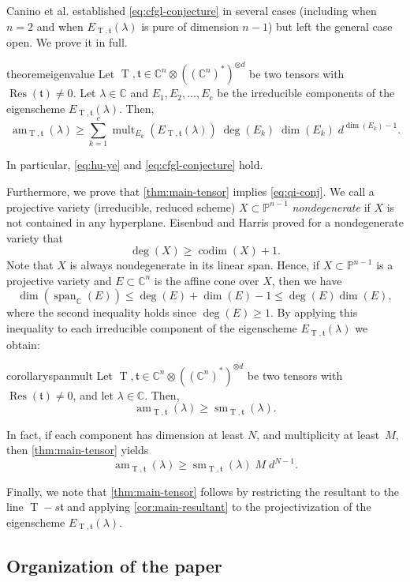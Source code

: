 \documentclass[11pt,letterpaper]{article}
\numberwithin{equation}{section}
\newcommand{\PP}{\mathbb{P}}
\newcommand{\CC}{\mathbb{C}}
\newcommand{\ft}{\mathfrak{t}}
\DeclareMathOperator{\codim}{codim}
\DeclareMathOperator{\am}{am}
\DeclareMathOperator{\sm}{sm}
\DeclareMathOperator{\Res}{Res}
\DeclareMathOperator{\T}{T}
\DeclareMathOperator{\mult}{mult}
\begin{document}
Canino et al. established \eqref{eq:cfgl-conjecture} in several cases (including when $n=2$ and when $E_{\T,\ft}(\lambda)$ is pure of dimension $n-1$) but left the general case open.
We prove it in full.
\begin{restatable}{theorem}{eigenvalue}
\label{thm:main-tensor}
Let $\T,\ft\in\CC^n\otimes((\CC^n)^\ast)^{\otimes d}$ be two tensors with $\Res(\ft)\neq 0$.
    Let $\lambda\in\CC$ and $E_1,E_2,\dots,E_c$ be the irreducible components of the eigenscheme $E_{\T,\ft}(\lambda)$.
    Then, \[
    \am_{\T,\ft}(\lambda) \geq \sum_{k=1}^c \mult_{E_k}(E_{\T,\ft}(\lambda))\;\deg(E_k)\; \dim(E_k)\; d^{\dim(E_k)-1}. 
    \]
\end{restatable}
\noindent
In particular, \eqref{eq:hu-ye} and \eqref{eq:cfgl-conjecture} hold.

Furthermore, we prove that \cref{thm:main-tensor} implies \eqref{eq:qi-conj}.
We call a projective variety (irreducible, reduced scheme) $X\subset\PP^{n-1}$ \emph{nondegenerate} if $X$ is not contained in any hyperplane.
Eisenbud and Harris \cite{Eisenbud-Harris-87} proved for a nondegenerate variety that \[
\deg(X) \geq \codim(X) + 1.
\] Note that $X$ is always nondegenerate in its linear span.
Hence, if $X\subset\PP^{n-1}$ is a projective variety and $E\subset \CC^{n}$ is the affine cone over $X$, then we have \[
\dim\left(\operatorname{span}_{\CC}(E)\right) \leq \deg(E) + \dim(E) - 1 \leq \deg(E)\dim(E), 
\] where the second inequality holds since $\deg(E)\geq 1$.
By applying this inequality to each irreducible component of the eigenscheme $E_{\T,\ft}(\lambda)$ we obtain:

\begin{restatable}{corollary}{spanmult}
\label{cor:span-mult}
    Let $\T,\ft\in\CC^n\otimes((\CC^n)^\ast)^{\otimes d}$ be two tensors with $\Res(\ft)\neq 0$, and
    let $\lambda\in\CC$.
    Then, \[
    \am_{\T,\ft}(\lambda)\geq \sm_{\T,\ft}(\lambda).
    \]
\end{restatable}
\noindent
In fact, if each component has dimension at least $N$, and multiplicity at least~$M$, then \cref{thm:main-tensor} yields \[
\am_{\T,\ft}(\lambda) \geq \sm_{\T,\ft}(\lambda)\; M \; d^{N-1}.
\] 

Finally, we note that \cref{thm:main-tensor} follows by restricting the resultant to the line $\T-s\ft$ and applying \cref{cor:main-resultant} to the projectivization of the eigenscheme $E_{\T,\ft}(\lambda)$. 

\subsection{Organization of the paper}
\end{document}
